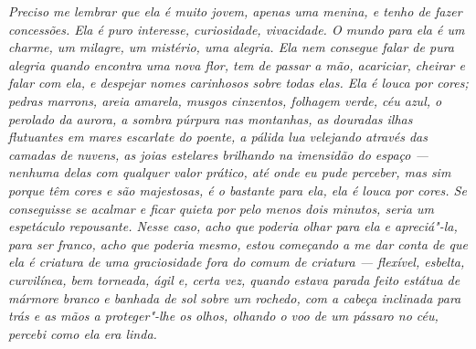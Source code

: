{\itshape
Preciso me lembrar que ela é muito jovem, apenas uma menina, e tenho de fazer
concessões. Ela é puro interesse, curiosidade, vivacidade. O mundo para ela é
um charme, um milagre, um mistério, uma alegria. Ela nem consegue falar de
pura alegria quando encontra uma nova flor, tem de passar a mão,
acariciar, cheirar e falar com ela, e despejar nomes carinhosos sobre todas elas. Ela é
louca por cores; pedras marrons, areia amarela, musgos cinzentos, folhagem
verde, céu azul, o perolado da aurora, a sombra púrpura nas montanhas, as
douradas ilhas flutuantes em mares escarlate do poente, a pálida lua
velejando através das camadas de nuvens, as joias estelares
brilhando na imensidão do espaço --- nenhuma delas com qualquer valor prático,
até onde eu pude perceber, mas sim porque têm cores e são majestosas, é o bastante para ela, 
ela é louca por cores. Se conseguisse se acalmar e ficar
quieta por pelo menos dois minutos, seria um espetáculo
repousante. Nesse caso, acho que poderia olhar para ela e apreciá"-la, para ser franco, acho
que poderia mesmo, estou começando a me dar conta de que ela é criatura de uma graciosidade fora do comum
de criatura --- flexível, esbelta, curvilínea, bem torneada, ágil e, certa vez,
quando estava parada feito estátua de mármore branco e banhada de sol sobre
um rochedo, com a cabeça inclinada para trás e as mãos a proteger"-lhe
os olhos, olhando o voo de um pássaro no céu, percebi como ela era linda.
}\par

